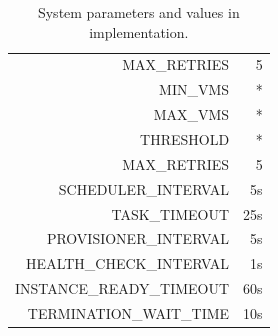 \documentclass[a4paper]{IEEEtran}
\begin{document}
\begin{table}[tbp]
  \centering
  \begin{tabular}{|r|r|}
    \hline
     MAX\_RETRIES & 5 \\
     MIN\_VMS & * \\
     MAX\_VMS & * \\
     THRESHOLD & * \\
     MAX\_RETRIES & 5 \\
     SCHEDULER\_INTERVAL & 5s \\
     TASK\_TIMEOUT & 25s \\
     PROVISIONER\_INTERVAL & 5s \\
     HEALTH\_CHECK\_INTERVAL & 1s \\
     INSTANCE\_READY\_TIMEOUT & 60s \\
     TERMINATION\_WAIT\_TIME & 10s \\
     \hline
  \end{tabular}
  \vspace{0.25cm}
  \caption{System parameters and values in implementation.}
  \label{table:system_params}
\end{table}





\end{document}
